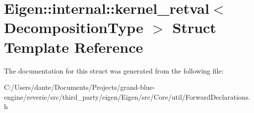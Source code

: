 \hypertarget{struct_eigen_1_1internal_1_1kernel__retval}{}\section{Eigen\+::internal\+::kernel\+\_\+retval$<$ Decomposition\+Type $>$ Struct Template Reference}
\label{struct_eigen_1_1internal_1_1kernel__retval}


The documentation for this struct was generated from the following file\+:\begin{DoxyCompactItemize}
\item 
C\+:/\+Users/dante/\+Documents/\+Projects/grand-\/blue-\/engine/reverie/src/third\+\_\+party/eigen/\+Eigen/src/\+Core/util/Forward\+Declarations.\+h\end{DoxyCompactItemize}
